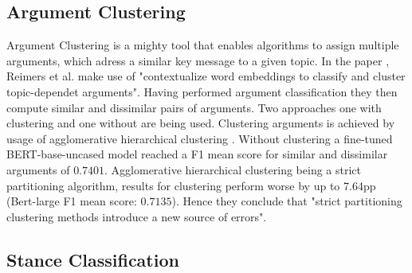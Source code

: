    \subsection{Argument Clustering}
        Argument Clustering is a mighty tool that enables algorithms to assign multiple arguments, which adress a similar
        key message to a given topic. In the paper \cite{reimers2019classification}, Reimers et al. make use of 
        "contextualize word embeddings to classify and cluster topic-dependet arguments". Having performed argument
        classification they then compute similar and dissimilar pairs of arguments. Two approaches one with clustering
        and one without are being used. 
        Clustering arguments is achieved by usage of agglomerative hierarchical clustering \cite{day1984efficient}. 
        Without clustering a fine-tuned BERT-base-uncased model reached a F1 mean score for similar and dissimilar
        arguments of $0.7401$. 
        Agglomerative hierarchical clustering being a strict partitioning algorithm, results for clustering perform
        worse by up to 7.64pp (Bert-large F1 mean score: $0.7135$). Hence they conclude that "strict partitioning 
        clustering methods introduce a new source of errors".

        

    \subsection{Stance Classification}
